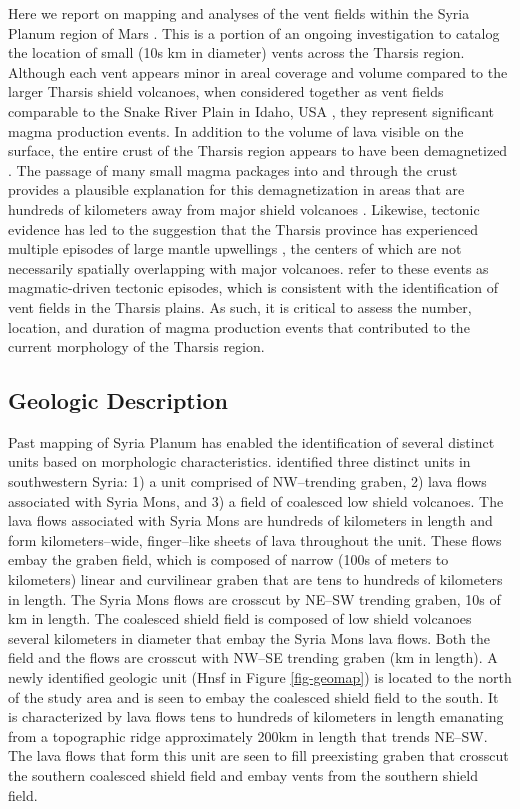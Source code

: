 Here we report on mapping and analyses of the vent fields within the Syria Planum region of Mars \citep{Baptista2008}. This is a portion of an ongoing investigation to catalog the location of small (10s km in diameter) vents across the Tharsis region.  Although each vent appears minor in areal coverage and volume compared to the larger Tharsis shield volcanoes, when considered together as vent fields comparable to the Snake River Plain in Idaho, USA \citep{Greeley1977,Greeley1982}, they represent significant magma production events. In addition to the volume of lava visible on the surface, the entire crust of the Tharsis region appears to have been demagnetized \citep{Connerney2005,Lillis2006}. The passage of many small magma packages into and through the crust provides a plausible explanation for this demagnetization in areas that are hundreds of kilometers away from major shield volcanoes \citep{Lillis2009}.  Likewise, tectonic evidence has led to the suggestion that the Tharsis province has experienced multiple episodes of large mantle upwellings \citep{Plescia1982,Mege1996,Anderson2001,Anderson2004,Wilson2002}, the centers of which are not necessarily spatially overlapping with major volcanoes.  \citet{Anderson2001,Anderson2004} refer to these events as magmatic-driven tectonic episodes, which is consistent with the identification of vent fields in the Tharsis plains.  As such, it is critical to assess the number, location, and duration of magma production events that contributed to the current morphology of the Tharsis region.

\subsection{Geologic Description}

Past mapping of Syria Planum has enabled the identification of several distinct units based on morphologic characteristics. \citet{Baptista2008} identified three distinct units in southwestern Syria: 1) a unit comprised of NW--trending graben, 2) lava flows associated with Syria Mons, and 3) a field of coalesced low shield volcanoes. The lava flows associated with Syria Mons are hundreds of kilometers in length and form kilometers--wide, finger--like sheets of lava throughout the unit. These flows embay the graben field, which is composed of narrow (100s of meters to kilometers) linear and curvilinear graben that are tens to hundreds of kilometers in length. The Syria Mons flows are crosscut by NE--SW trending graben, 10s of km in length. The coalesced shield field is composed of low shield volcanoes several kilometers in diameter that embay the Syria Mons lava flows. Both the field and the flows are crosscut with NW--SE trending graben (km in length). A newly identified geologic unit (Hnsf in Figure \ref{fig-geomap}) is located to the north of the \citet{Baptista2008} study area and is seen to embay the coalesced shield field to the south. It is characterized by lava flows tens to hundreds of kilometers in length emanating from a topographic ridge approximately 200km in length that trends NE--SW. The lava flows that form this unit are seen to fill preexisting graben that crosscut the southern coalesced shield field and embay vents from the southern shield field.

